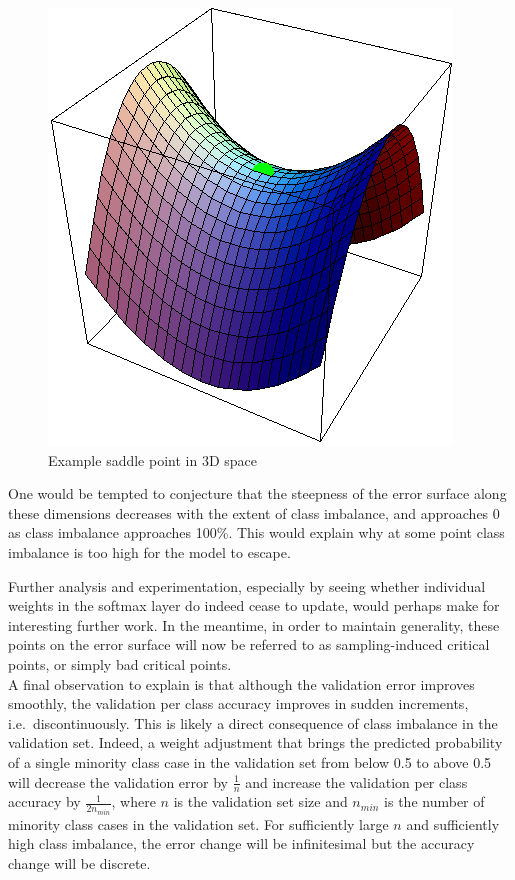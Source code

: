 \documentclass[a4paper,11pt]{article}
\begin{document}
\begin{figure}[h!]
	\centering
	\includegraphics[scale=0.4]{images/saddle_point.png}
	\caption{Example saddle point in 3D space}
    \label{f45}
\end{figure}

One would be tempted to conjecture that the steepness of the error surface along these dimensions decreases with the extent of class imbalance, and approaches 0 as class imbalance approaches 100\%. This would explain why at some point class imbalance is too high for the model to escape. 

Further analysis and experimentation, especially by seeing whether individual weights in the softmax layer do indeed cease to update, would perhaps make for interesting further work. In the meantime, in order to maintain generality, these points on the error surface will now be referred to as sampling-induced critical points, or simply bad critical points. \\

A final observation to explain is that although the validation error improves smoothly, the validation per class accuracy improves in sudden increments, i.e.\ discontinuously. This is likely a direct consequence of class imbalance in the validation set. Indeed, a weight adjustment that brings the predicted probability of a single minority class case in the validation set from below 0.5 to above 0.5 will decrease the validation error by $\frac{1}{n}$ and increase the validation per class accuracy by $\frac{1}{2n_{min}}$, where $n$ is the validation set size and $n_{min}$ is the number of minority class cases in the validation set. For sufficiently large $n$ and sufficiently high class imbalance, the error change will be infinitesimal but the accuracy change will be discrete.
\end{document}
